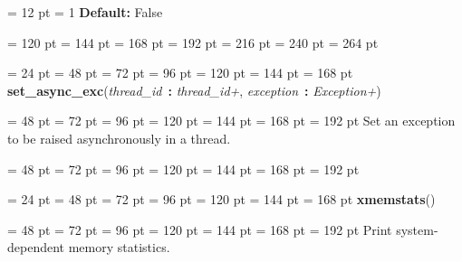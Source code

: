 {{{{{{{{{{\par \pagebreak[2.900000] \noindent \hangindent = 12 pt \hangafter = 1 
{\bf Default: \/}False\par}
{\par \noindent  \leftskip = 120 pt  \leftmargini = 144 pt  \leftmarginii = 168 pt  \leftmarginiii = 192 pt  \leftmarginiv = 216 pt  \leftmarginv = 240 pt  \leftmarginvi = 264 pt \par}
\par}
\par}
\par}
\par}
\par}
\par}
\par}
\par}
{\par \noindent  \leftskip = 24 pt  \leftmargini = 48 pt  \leftmarginii = 72 pt  \leftmarginiii = 96 pt  \leftmarginiv = 120 pt  \leftmarginv = 144 pt  \leftmarginvi = 168 pt {\bf {\large {\bf set{\_}async{\_}exc\/}}\/}({\em thread{\_}id\/}~{\bf :}  {\em thread{\_}id+\/}, {\em exception\/}~{\bf :}  {\em Exception+\/}){\par \noindent
{\par \noindent  \leftskip = 48 pt  \leftmargini = 72 pt  \leftmarginii = 96 pt  \leftmarginiii = 120 pt  \leftmarginiv = 144 pt  \leftmarginv = 168 pt  \leftmarginvi = 192 pt  Set an exception to be raised asynchronously in a thread.\par}
{\par \noindent  \leftskip = 48 pt  \leftmargini = 72 pt  \leftmarginii = 96 pt  \leftmarginiii = 120 pt  \leftmarginiv = 144 pt  \leftmarginv = 168 pt  \leftmarginvi = 192 pt {\par \noindent
\par}
\par}
\par}
\par}
{\par \noindent  \leftskip = 24 pt  \leftmargini = 48 pt  \leftmarginii = 72 pt  \leftmarginiii = 96 pt  \leftmarginiv = 120 pt  \leftmarginv = 144 pt  \leftmarginvi = 168 pt {\bf {\large {\bf xmemstats\/}}\/}(){\par \noindent
{\par \noindent  \leftskip = 48 pt  \leftmargini = 72 pt  \leftmarginii = 96 pt  \leftmarginiii = 120 pt  \leftmarginiv = 144 pt  \leftmarginv = 168 pt  \leftmarginvi = 192 pt  Print system-dependent memory statistics.\par}
}}}
